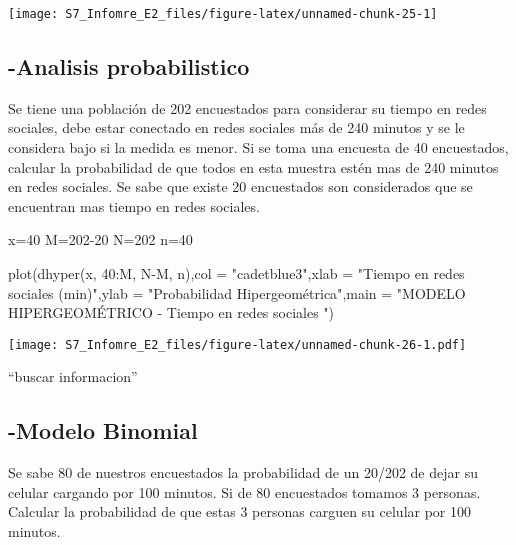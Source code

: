 \documentclass[
]{article}
\newenvironment{Shaded}{\begin{snugshade}}{\end{snugshade}}
\newcommand{\AttributeTok}[1]{\textcolor[rgb]{0.77,0.63,0.00}{#1}}
\newcommand{\DecValTok}[1]{\textcolor[rgb]{0.00,0.00,0.81}{#1}}
\newcommand{\FunctionTok}[1]{\textcolor[rgb]{0.00,0.00,0.00}{#1}}
\newcommand{\NormalTok}[1]{#1}
\newcommand{\OtherTok}[1]{\textcolor[rgb]{0.56,0.35,0.01}{#1}}
\newcommand{\SpecialCharTok}[1]{\textcolor[rgb]{0.00,0.00,0.00}{#1}}
\newcommand{\StringTok}[1]{\textcolor[rgb]{0.31,0.60,0.02}{#1}}
\begin{document}
\texttt{[image: S7\_Infomre\_E2\_files/figure-latex/unnamed-chunk-25-1]}

\hypertarget{analisis-probabilistico}{%
\subsection{-Analisis probabilistico}\label{analisis-probabilistico}}

Se tiene una población de 202 encuestados para considerar su tiempo en
redes sociales, debe estar conectado en redes sociales más de 240
minutos y se le considera bajo si la medida es menor. Si se toma una
encuesta de 40 encuestados, calcular la probabilidad de que todos en
esta muestra estén mas de 240 minutos en redes sociales. Se sabe que
existe 20 encuestados son considerados que se encuentran mas tiempo en
redes sociales.

\begin{Shaded}
\begin{Highlighting}[]
\NormalTok{x}\OtherTok{=}\DecValTok{40}
\NormalTok{M}\OtherTok{=}\DecValTok{202{-}20}
\NormalTok{N}\OtherTok{=}\DecValTok{202}
\NormalTok{n}\OtherTok{=}\DecValTok{40}

\FunctionTok{plot}\NormalTok{(}\FunctionTok{dhyper}\NormalTok{(x, }\DecValTok{40}\SpecialCharTok{:}\NormalTok{M, N}\SpecialCharTok{{-}}\NormalTok{M, n),}\AttributeTok{col =} \StringTok{"cadetblue3"}\NormalTok{,}\AttributeTok{xlab =} \StringTok{"Tiempo en redes sociales (min)"}\NormalTok{,}\AttributeTok{ylab =} \StringTok{"Probabilidad Hipergeométrica"}\NormalTok{,}\AttributeTok{main =} \StringTok{"MODELO HIPERGEOMÉTRICO {-} Tiempo en redes sociales "}\NormalTok{)}
\end{Highlighting}
\end{Shaded}

\texttt{[image: S7\_Infomre\_E2\_files/figure-latex/unnamed-chunk-26-1.pdf]}

``buscar informacion''

\hypertarget{modelo-binomial}{%
\subsection{-Modelo Binomial}\label{modelo-binomial}}

Se sabe 80 de nuestros encuestados la probabilidad de un 20/202 de dejar
su celular cargando por 100 minutos. Si de 80 encuestados tomamos 3
personas. Calcular la probabilidad de que estas 3 personas carguen su
celular por 100 minutos.
\end{document}
